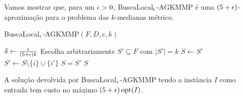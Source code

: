 Vamos mostrar que, para um $\epsilon > 0$, {\sc BuscaLocal$_\epsilon$-AGKMMP} é uma $(5 + \epsilon)$-aproximação para o problema das $k$-medianas métrico.
\begin{algorithm}[H]
    \caption{\sc BuscaLocal$_\epsilon$-AGKMMP$(F,D,c,k)$}
    \begin{algorithmic}[1]
        \State $\delta \gets \frac{\epsilon}{(5+\epsilon)k}$
        \State Escolha arbitrariamente $S' \subseteq F$ com $|S'| = k$
        \Repeat
        \State $S\gets S'$
        \State $S' \gets S \setminus \{i\} \cup \{i'\}$
        \EndIf
        \Until $S=S'$
        \State \Return $S$
    \end{algorithmic}
\end{algorithm}

\begin{theorem}
    A solução devolvida por {\sc BuscaLocal$_\epsilon$-AGKMMP} tendo a instância $I$ como entrada tem custo no máximo $(5+\epsilon)\,\mathrm{opt}(I)$.
\end{theorem}

